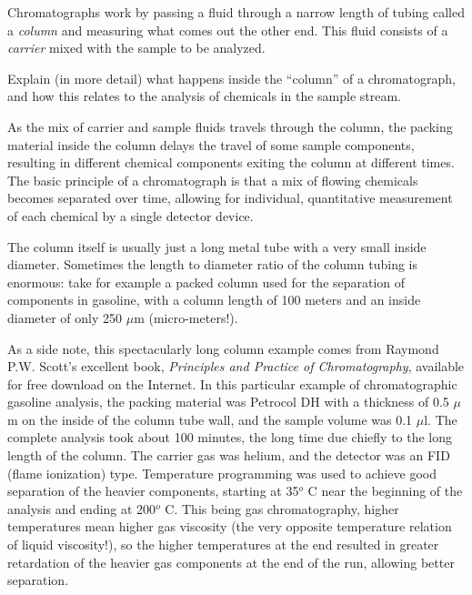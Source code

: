 

Chromatographs work by passing a fluid through a narrow length of tubing called a {\it column} and measuring what comes out the other end.  This fluid consists of a {\it carrier} mixed with the sample to be analyzed.  

Explain (in more detail) what happens inside the ``column'' of a chromatograph, and how this relates to the analysis of chemicals in the sample stream.







As the mix of carrier and sample fluids travels through the column, the packing material inside the column delays the travel of some sample components, resulting in different chemical components exiting the column at different times.  The basic principle of a chromatograph is that a mix of flowing chemicals becomes separated over time, allowing for individual, quantitative measurement of each chemical by a single detector device.

\vskip 10pt

The column itself is usually just a long metal tube with a very small inside diameter.  Sometimes the length to diameter ratio of the column tubing is enormous: take for example a packed column used for the separation of components in gasoline, with a column length of 100 meters and an inside diameter of only 250 $\mu$m (micro-meters!).

As a side note, this spectacularly long column example comes from Raymond P.W. Scott's excellent book, {\it Principles and Practice of Chromatography}, available for free download on the Internet.  In this particular example of chromatographic gasoline analysis, the packing material was Petrocol DH with a thickness of 0.5 $\mu$m on the inside of the column tube wall, and the sample volume was 0.1 $\mu$l.  The complete analysis took about 100 minutes, the long time due chiefly to the long length of the column.  The carrier gas was helium, and the detector was an FID (flame ionization) type.  Temperature programming was used to achieve good separation of the heavier components, starting at 35$^{o}$ C near the beginning of the analysis and ending at 200$^{o}$ C.  This being gas chromatography, higher temperatures mean higher gas viscosity (the very opposite temperature relation of liquid viscosity!), so the higher temperatures at the end resulted in greater retardation of the heavier gas components at the end of the run, allowing better separation.











